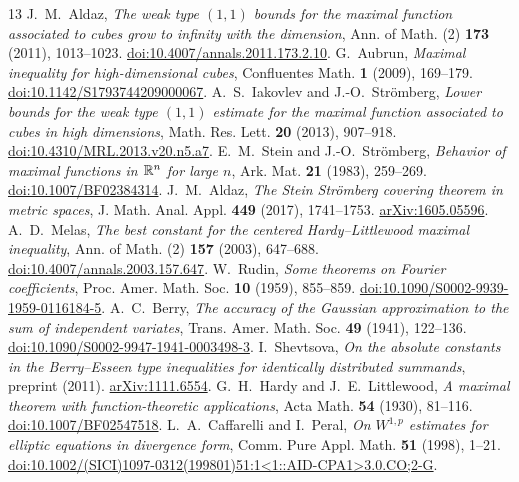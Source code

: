 \begin{thebibliography}{13}
 J.~M.~Aldaz, \emph{The weak type $(1,1)$ bounds for the maximal function associated to cubes grow to infinity with the dimension}, Ann. of Math. (2) \textbf{173} (2011), 1013--1023. \href{https://doi.org/10.4007/annals.2011.173.2.10}{doi:10.4007/annals.2011.173.2.10}.
 G.~Aubrun, \emph{Maximal inequality for high-dimensional cubes}, Confluentes Math. \textbf{1} (2009), 169--179. \href{https://doi.org/10.1142/S1793744209000067}{doi:10.1142/S1793744209000067}.
 A.~S.~Iakovlev and J.-O.~Str\"omberg, \emph{Lower bounds for the weak type $(1,1)$ estimate for the maximal function associated to cubes in high dimensions}, Math. Res. Lett. \textbf{20} (2013), 907--918. \href{https://doi.org/10.4310/MRL.2013.v20.n5.a7}{doi:10.4310/MRL.2013.v20.n5.a7}.
 E.~M.~Stein and J.-O.~Str\"omberg, \emph{Behavior of maximal functions in $\mathbb R^n$ for large $n$}, Ark. Mat. \textbf{21} (1983), 259--269. \href{https://doi.org/10.1007/BF02384314}{doi:10.1007/BF02384314}.
 J.~M.~Aldaz, \emph{The Stein Str\"omberg covering theorem in metric spaces}, J. Math. Anal. Appl. \textbf{449} (2017), 1741--1753. \href{https://arxiv.org/abs/1605.05596}{arXiv:1605.05596}.
 A.~D.~Melas, \emph{The best constant for the centered Hardy--Littlewood maximal inequality}, Ann. of Math. (2) \textbf{157} (2003), 647--688. \href{https://doi.org/10.4007/annals.2003.157.647}{doi:10.4007/annals.2003.157.647}.
 W.~Rudin, \emph{Some theorems on Fourier coefficients}, Proc. Amer. Math. Soc. \textbf{10} (1959), 855--859. \href{https://doi.org/10.1090/S0002-9939-1959-0116184-5}{doi:10.1090/S0002-9939-1959-0116184-5}.
 A.~C.~Berry, \emph{The accuracy of the Gaussian approximation to the sum of independent variates}, Trans. Amer. Math. Soc. \textbf{49} (1941), 122--136. \href{https://doi.org/10.1090/S0002-9947-1941-0003498-3}{doi:10.1090/S0002-9947-1941-0003498-3}.
 I.~Shevtsova, \emph{On the absolute constants in the Berry--Esseen type inequalities for identically distributed summands}, preprint (2011). \href{https://arxiv.org/abs/1111.6554}{arXiv:1111.6554}.
 G.~H.~Hardy and J.~E.~Littlewood, \emph{A maximal theorem with function-theoretic applications}, Acta Math. \textbf{54} (1930), 81--116. \href{https://doi.org/10.1007/BF02547518}{doi:10.1007/BF02547518}.
 L.~A.~Caffarelli and I.~Peral, \emph{On $W^{1,p}$ estimates for elliptic equations in divergence form}, Comm. Pure Appl. Math. \textbf{51} (1998), 1--21. \href{https://doi.org/10.1002/(SICI)1097-0312(199801)51:1<1::AID-CPA1>3.0.CO;2-G}{doi:10.1002/(SICI)1097-0312(199801)51:1<1::AID-CPA1>3.0.CO;2-G}.

\end{thebibliography}
